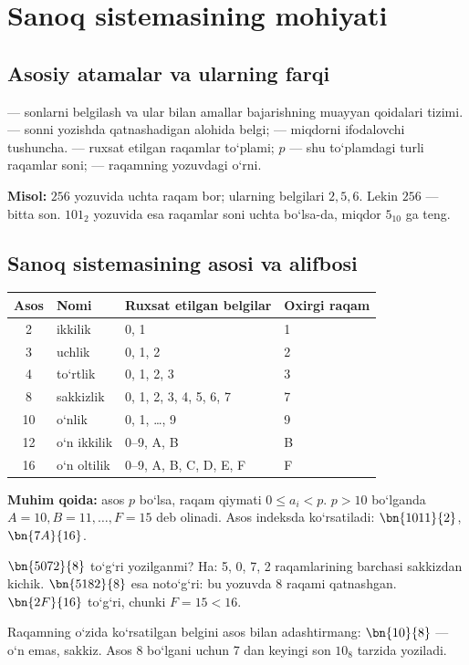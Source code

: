 \documentclass[11pt,a4paper,openany,oneside]{book}
\begin{document}
\tableofcontents
\mainmatter
\chapter{Sanoq sistemasining mohiyati}
\section{Asosiy atamalar va ularning farqi}
\begin{definition}
 — sonlarni belgilash va ular bilan amallar bajarishning muayyan qoidalari tizimi.  — sonni yozishda qatnashadigan alohida belgi;  — miqdorni ifodalovchi tushuncha.  — ruxsat etilgan raqamlar to‘plami;  \(p\) — shu to‘plamdagi turli raqamlar soni;  — raqamning yozuvdagi o‘rni. 
\end{definition}
\textbf{Misol:} \(256\) yozuvida uchta raqam bor; ularning belgilari \(2,5,6\). Lekin \(256\) — bitta son. \(101_2\) yozuvida esa raqamlar soni uchta bo‘lsa-da, miqdor \(5_{10}\) ga teng.

\section{Sanoq sistemasining asosi va alifbosi}
\begin{center}\renewcommand{\arraystretch}{1.25}
\begin{tabularx}{\textwidth}{@{}c l X l@{}}\toprule
Asos & Nomi & Ruxsat etilgan belgilar & Oxirgi raqam \\ \midrule
2 & ikkilik & 0, 1 & 1 \\
3 & uchlik & 0, 1, 2 & 2 \\
4 & to‘rtlik & 0, 1, 2, 3 & 3 \\
8 & sakkizlik & 0, 1, 2, 3, 4, 5, 6, 7 & 7 \\
10 & o‘nlik & 0, 1, \ldots, 9 & 9 \\
12 & o‘n ikkilik & 0–9, A, B & B \\
16 & o‘n oltilik & 0–9, A, B, C, D, E, F & F \\
\bottomrule\end{tabularx}\end{center}
\textbf{Muhim qoida:} asos \(p\) bo‘lsa, raqam qiymati \(0\le a_i<p\). \(p>10\) bo‘lganda \(A=10, B=11,\ldots, F=15\) deb olinadi. Asos indeksda ko‘rsatiladi: \(\bn{1011}{2}\), \(\bn{7A}{16}\). 
\begin{worked}
\(\bn{5072}{8}\) to‘g‘ri yozilganmi? Ha: 5, 0, 7, 2 raqamlarining barchasi sakkizdan kichik. \(\bn{5182}{8}\) esa noto‘g‘ri: bu yozuvda 8 raqami qatnashgan. \(\bn{2F}{16}\) to‘g‘ri, chunki \(F=15<16\).
\end{worked}
\begin{important}
Raqamning o‘zida ko‘rsatilgan belgini asos bilan adashtirmang: \(\bn{10}{8}\) — o‘n emas, sakkiz. Asos 8 bo‘lgani uchun 7 dan keyingi son \(10_8\) tarzida yoziladi.
\end{important}
\end{document}

